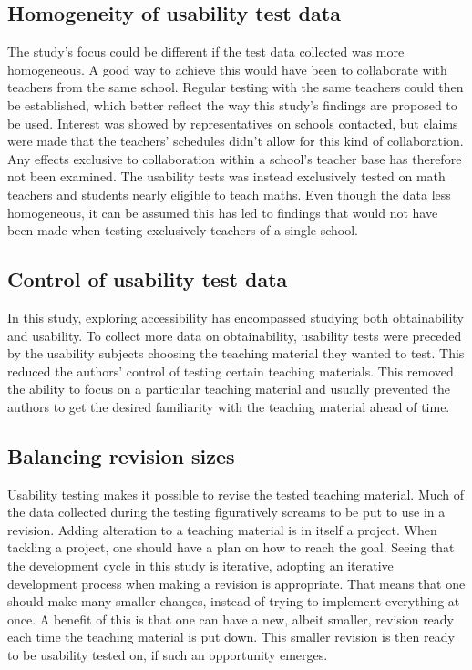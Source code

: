 \subsection{Homogeneity of usability test data}
The study's focus could be different if the test data collected was more homogeneous. A good way to achieve this would have been to collaborate with teachers from the same school. Regular testing with the same teachers could then be established, which better reflect the way this study's findings are proposed to be used. Interest was showed by representatives on schools contacted, but claims were made that the teachers' schedules didn't allow for this kind of collaboration. 
Any effects exclusive to collaboration within a school's teacher base has therefore not been examined. The usability tests was instead exclusively tested on math teachers and students nearly eligible to teach maths. Even though the data less homogeneous, it can be assumed this has led to findings that would not have been made when testing exclusively teachers of a single school.

\subsection{Control of usability test data}
In this study, exploring accessibility has encompassed studying both obtainability and usability. To collect more data on obtainability, usability tests were preceded by the usability subjects choosing the teaching material they wanted to test. This reduced the authors' control of testing certain teaching materials. 
This removed the ability to focus on a particular teaching material and usually prevented the authors to get the desired familiarity with the teaching material ahead of time.

\subsection{Balancing revision sizes}
Usability testing makes it possible to revise the tested teaching material. Much of the data collected during the testing figuratively screams to be put to use in a revision. Adding alteration to a teaching material is in itself a project. When tackling a project, one should have a plan on how to reach the goal. Seeing that the development cycle in this study is iterative, adopting an iterative development process when making a revision is appropriate. 
That means that one should make many smaller changes, instead of trying to implement everything at once. A benefit of this is that one can have a new, albeit smaller, revision ready each time the teaching material is put down. This smaller revision is then ready to be usability tested on, if such an opportunity emerges. 

